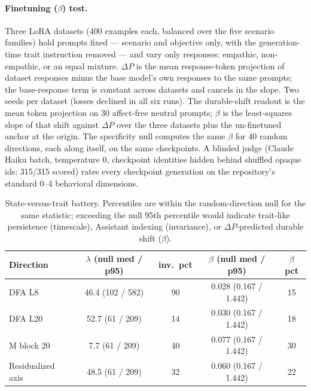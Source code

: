 \paragraph{Finetuning ($\beta$) test.}
Three LoRA datasets (400 examples each, balanced over the five scenario
families) hold prompts fixed --- scenario and objective only, with the
generation-time trait instruction removed --- and vary only responses:
empathic, non-empathic, or an equal mixture. $\Delta P$ is the mean
response-token projection of dataset responses minus the base model's own
responses to the same prompts; the base-response term is constant across
datasets and cancels in the slope. Two seeds per dataset
(losses declined in all six runs). The durable-shift readout is the mean
token projection on 30 affect-free neutral prompts;
$\beta$ is the least-squares slope of that shift against $\Delta P$ over the
three datasets plus the un-finetuned anchor at the origin. The specificity
null computes the same $\beta$ for 40 random directions, each along itself,
on the same checkpoints. A blinded judge (Claude Haiku batch, temperature 0,
checkpoint identities hidden behind shuffled opaque ids; 315/315 scored)
rates every checkpoint generation on the repository's standard 0--4
behavioral dimensions.

\begin{table}[h]
\centering
\caption{State-versus-trait battery. Percentiles are within the
random-direction null for the same statistic; exceeding the null 95th
percentile would indicate trait-like persistence (timescale), Assistant
indexing (invariance), or $\Delta P$-predicted durable shift ($\beta$).}
\label{tab:state-trait}
\small
\begin{tabular}{lcccc}
\toprule
Direction & $\lambda$ (null med / p95) & inv.\ pct & $\beta$ (null med / p95) & $\beta$ pct \\
\midrule
DFA L8            & 46.4 (102 / 582)  & 90 & 0.028 (0.167 / 1.442) & 15 \\
DFA L20           & 52.7 (61 / 209)   & 14 & 0.030 (0.167 / 1.442) & 18 \\
M block 20        & 7.7 (61 / 209)    & 40 & 0.077 (0.167 / 1.442) & 30 \\
Residualized axis & 48.5 (61 / 209)   & 32 & 0.060 (0.167 / 1.442) & 22 \\
\bottomrule
\end{tabular}
\end{table}


